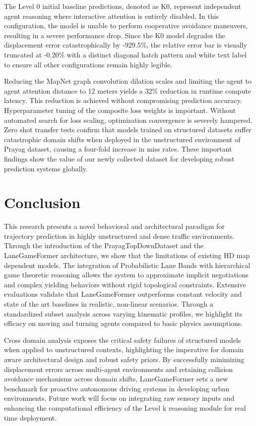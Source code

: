 \documentclass{article}
\begin{document}
The Level 0 initial baseline predictions, denoted as K0, represent independent agent reasoning where interactive attention is entirely disabled. In this configuration, the model is unable to perform cooperative avoidance maneuvers, resulting in a severe performance drop. Since the K0 model degrades the displacement error catastrophically by -929.5\%, the relative error bar is visually truncated at -0.20\% with a distinct diagonal hatch pattern and white text label to ensure all other configurations remain highly legible.

Reducing the MapNet graph convolution dilation scales and limiting the agent to agent attention distance to 12 meters yields a 32\% reduction in runtime compute latency. This reduction is achieved without compromising prediction accuracy. Hyperparameter tuning of the composite loss weights is important. Without automated search for loss scaling, optimization convergence is severely hampered. Zero shot transfer tests confirm that models trained on structured datasets suffer catastrophic domain shifts when deployed in the unstructured environment of Prayag dataset, causing a four-fold increase in miss rates. These important findings show the value of our newly collected dataset for developing robust prediction systems globally.

\section{Conclusion}
This research presents a novel behavioral and architectural paradigm for trajectory prediction in highly unstructured and dense traffic environments. Through the introduction of the PrayagTopDownDataset and the LaneGameFormer architecture, we show that the limitations of existing HD map dependent models. The integration of Probabilistic Lane Bands with hierarchical game theoretic reasoning allows the system to approximate implicit negotiations and complex yielding behaviors without rigid topological constraints. Extensive evaluations validate that LaneGameFormer outperforms constant velocity and state of the art baselines in realistic, non-linear scenarios. Through a standardized subset analysis across varying kinematic profiles, we highlight its efficacy on moving and turning agents compared to basic physics assumptions.

Cross domain analysis exposes the critical safety failures of structured models when applied to unstructured contexts, highlighting the imperative for domain aware architectural design and robust safety priors. By successfully minimizing displacement errors across multi-agent environments and retaining collision avoidance mechanisms across domain shifts, LaneGameFormer sets a new benchmark for proactive autonomous driving systems in developing urban environments. Future work will focus on integrating raw sensory inputs and enhancing the computational efficiency of the Level k reasoning module for real time deployment.


\end{document}
